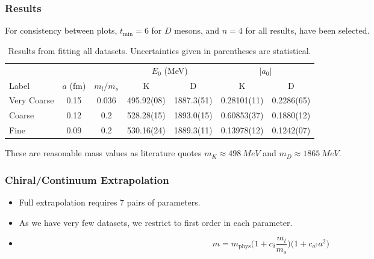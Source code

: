 \documentclass{beamer}
\begin{document}
\begin{frame}
    \frametitle{Results}
    For consistency between plots, $t_\mathrm{min}=6$ for $D$ mesons, and $n=4$ for all results, have been selected.
    \begin{table}
    \centering
    \tiny
    \begin{tabular}{l S[table-format=1.2] S[table-format=1.3] S[table-format=3.2(2)] S[table-format=4.1(2)] S[table-format=1.5(2)] S[table-format=1.4(2)]}
        \toprule
                    &                   &                   &        & \\
        \cmidrule(lr){4-5}\cmidrule(lr){6-7}
        Label       & {$a$ (\si{fm})}   & {$m_l / m_s$}     & {K}               & {D}               & {K}                & {D}\\
        \midrule
        Very Coarse & 0.15              & 0.036             & 495.92(08)        & 1887.3(51)        & 0.28101(11)        & 0.2286(65)\\
        Coarse      & 0.12              & 0.2               & 528.28(15)        & 1893.0(15)        & 0.60853(37)        & 0.1880(12)\\
        Fine        & 0.09              & 0.2               & 530.16(24)        & 1889.3(11)        & 0.13978(12)        & 0.1242(07)\\
        \bottomrule
    \end{tabular}
    \normalsize
    \caption{Results from fitting all datasets. Uncertainties given in parentheses are statistical.}
    \end{table}
    These are reasonable mass values as literature\cite{zyla2020review} quotes $m_K \approx \SI{498}{MeV}$ and $m_D \approx \SI{1865}{MeV}$.
\end{frame}

\begin{frame}
    \frametitle{Chiral/Continuum Extrapolation}
    \begin{itemize}
        \item Full extrapolation\cite{chakraborty2017nonperturbative} requires 7 pairs of parameters.
        \item As we have very few datasets, we restrict to first order in each parameter. 
        \item[]
        \begin{equation*}
            m = m_\mathrm{phys} \Big(1 + c_\delta \frac{m_l}{m_s}\Big)\Big(1 + c_{a^2} a^2\Big)
        \end{equation*}
    \end{itemize}
\end{frame}
\end{document}
